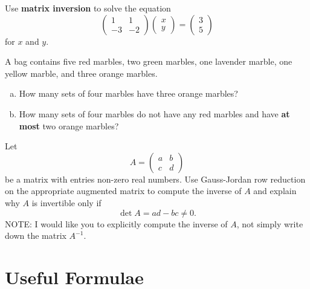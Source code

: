 \documentclass[12pt]{amsart}
\begin{document}
\begin{thm}[10 Points]
  Use {\bf matrix inversion} to solve the equation
  $$\left(\begin{array}{rr}
    1 & 1 \\
    -3 & -2
  \end{array}\right) \left(\begin{array}{r}
    x \\
    y
  \end{array}\right) = \left(\begin{array}{r}
    3 \\
    5
  \end{array}\right)$$
  for $x$ and $y$.
\end{thm}
\newpage

\begin{thm}[10 Points]\label{ex1}
  A bag contains five red marbles, two green marbles, one lavender marble, one yellow marble, and three orange marbles.
  \begin{enumerate}[(a)]
  \item
    How many sets of four marbles have three orange marbles?
    \vspace{2in}
  \item
    How many sets of four marbles do not have any red marbles and have {\bf at most} two orange marbles?
    \vspace{2in}
  \end{enumerate}
\end{thm}

\newpage

\begin{thm}\label{bonus}
  Let 
  $$A = \left(\begin{array}{cc} 
    a & b\\
    c & d
  \end{array}\right)$$
  be a matrix with entries non-zero real numbers.
  Use Gauss-Jordan row reduction on the appropriate augmented matrix to compute the inverse of $A$ and explain why $A$ is invertible only if
  $$\det{A} = ad - bc \neq 0.$$
  NOTE:  I would like you to explicitly compute the inverse of $A$, not simply write down the matrix $A^{-1}$.
\end{thm}

\newpage
\section{Useful Formulae}
\end{document}
